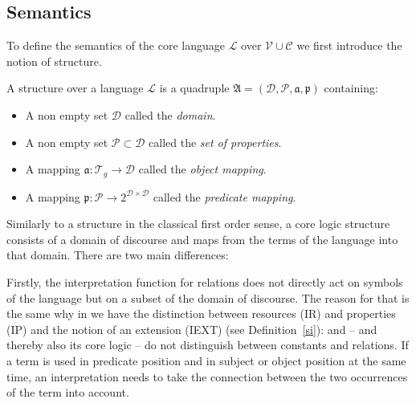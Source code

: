\subsection{Semantics}
To define the semantics of the core language $\mathcal{L}$ over $\mathcal{V}\cup\mathcal{C}$ we first introduce the notion of structure. 

\begin{definition}[Structure]\label{n3corestructure}
A structure over a language $\mathcal{L}$ 
is a quadruple $\mathfrak{A}=(\mathcal{D},\mathcal{P}, \mathfrak{a}, \mathfrak{p})$ containing:
\begin{itemize}
 \item A non empty set $\mathcal{D}$  
 called the \emph{domain}.
 \item A non empty set $\mathcal{P}\subset\mathcal{D}$ called the \emph{set of properties}.
 \item A mapping $\mathfrak{a}: \mathcal{T}_g\rightarrow \mathcal{D}$ 
 called the \emph{object mapping}.
\item A mapping $\mathfrak{p}: \mathcal{P}\rightarrow 2^{\mathcal{D}\times\mathcal{D}}$ called the \emph{predicate mapping}.  
\end{itemize}
\end{definition}
Similarly to a structure in the classical first order sense, a core logic structure 
consists of a domain of discourse and maps from the terms of the language into that domain. There are two main differences:


Firstly, the interpretation function for relations does not directly act on symbols of the language but on a subset of the domain of discourse.
The reason for that is the same why in \rdf we have the distinction between resources (IR) and properties (IP) and the notion of an extension (IEXT) (see Definition~\ref{si}):
\rdf and \nthree{} -- and thereby also its core logic -- do not distinguish between constants and relations.  If a term is used in predicate position and in subject or object position 
at the same time, an interpretation needs to take the connection between the two occurrences of the term into account. 

